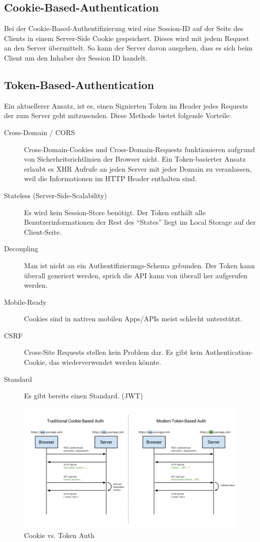 \subsection{Cookie-Based-Authentication}
Bei der Cookie-Based-Authentifizierung wird eine Session-ID auf der Seite des Clients in einem Server-Side Cookie gespeichert. Dieses wird mit jedem Request an den Server übermittelt. So kann der Server davon ausgehen, dass es sich beim Client um den Inhaber der Session ID handelt.

\subsection{Token-Based-Authentication}
Ein aktuellerer Ansatz, ist es, einen Signierten Token im Header jedes Requests der zum Server geht mitzusenden. Diese Methode bietet folgende Vorteile:

\begin{description}
  \item[Cross-Domain / CORS]
  Cross-Domain-Cookies und Cross-Domain-Requests funktionieren aufgrund von Sicherheitsrichtlinien der Browser nicht. Ein Token-basierter Ansatz erlaubt es XHR Aufrufe an jeden Server mit jeder Domain zu veranlassen, weil die Informationen im HTTP Header enthalten sind.
  \item[Stateless (Server-Side-Scalability)] Es wird kein Session-Store benötigt. Der Token enthält alle Benutzerinformationen der Rest des ``States'' liegt im Local Storage auf der Client-Seite.
  \item[Decoupling] Man ist nicht an ein Authentifizierungs-Schema gebunden. Der Token kann überall generiert werden, sprich die API kann von überall her aufgerufen werden.
  \item[Mobile-Ready] Cookies sind in nativen mobilen Apps/APIs meist schlecht unterstützt.
  \item[CSRF] Cross-Site Requests stellen kein Problem dar. Es gibt kein Authentication-Cookie, das wiederverwendet werden könnte.
  \item[Standard] Es gibt bereits einen Standard. (\gls{JWT})
\end{description}

\begin{figure}[H]
    \centering
    \includegraphics[width=\linewidth]{fig/cookie-token-auth}
    \caption{Cookie vs. Token Auth}
    \label{fig:pd:cookie-token-auth}
\end{figure}
